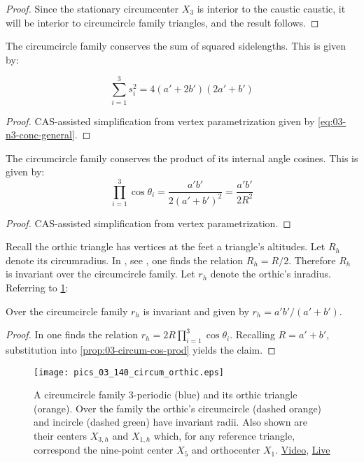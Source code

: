 \begin{proof}
Since the stationary circumcenter $X_3$ is interior to the caustic caustic, it will be interior to circumcircle family triangles, and the result follows.
\end{proof}

\begin{proposition}
The circumcircle family conserves the sum of squared sidelengths. This is given by:

\[ \sum_{i=1}^3 s_i^2=4(a' + 2 b')(2 a' + b') \]
\end{proposition}

\begin{proof}
CAS-assisted simplification from vertex parametrization given by \cref{eq:03-n3-conc-general}.
\end{proof}

\begin{proposition}
The circumcircle family conserves the product of its internal angle cosines. This is given by:
\[ \prod_{i=1}^3{\cos\theta_i}=\frac{a' b'}{2(a'+b')^2}=\frac{a' b'}{2 R^2}\]
\label{prop:03-circum-cos-prod}
\end{proposition}

\begin{proof}
CAS-assisted simplification from vertex parametrization.
\end{proof}

Recall the orthic triangle has vertices at the feet a triangle's altitudes. Let $R_h$ denote its circumradius. In , see \cite[Orthic Triangle, Eqn 7]{mw}, one finds the relation $R_h=R/2$. Therefore $R_h$ is invariant over the circumcircle family. Let $r_h$ denote the orthic's inradius. Referring to \cref{fig:03-circum-orthic}:


\begin{proposition}
Over the circumcircle family  $r_h$ is invariant and  given by $r_h=a' b'/(a'+b')$. 
\label{prop:03-circumcircle-rh}
\end{proposition}

\begin{proof}
In \cite[Orthic Triangle, Eqn. 5]{mw} one finds the relation  $r_h=2 R \prod_{i=1}^3{\cos\theta_i}$. Recalling $R=a'+b'$, substitution into \cref{prop:03-circum-cos-prod} yields the claim.
\end{proof}

\begin{figure}
    \centering
    \texttt{[image: pics\_03\_140\_circum\_orthic.eps]}
    \caption{A circumcircle family 3-periodic (blue) and its orthic triangle (orange). Over the family the orthic's circumcircle (dashed orange) and incircle (dashed green) have invariant radii. Also shown are their centers $X_{3,h}$ and $X_{1,h}$ which, for any reference triangle, correspond the nine-point center $X_5$ and orthocenter $X_1$. \href{https://youtu.be/wUu2iMesv3U}{Video}, \href{https://bit.ly/2PHJZma}{Live}}
    \label{fig:03-circum-orthic}
\end{figure}


